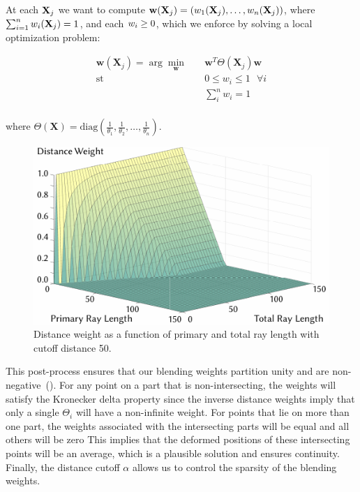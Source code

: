
At each $\mathbf{X}_j$ we want to compute $\mathbf{w}(\mathbf{X}_j) =  \left( w_1(\mathbf{X}_j), \dots, w_n(\mathbf{X}_j) \right)$, where 
$\sum_{i=1}^nw_i(\mathbf{X}_j) = 1$, and each $w_i \geq 0$, which we enforce by solving a local optimization problem: 

\begin{equation}
\begin{aligned}
\mathbf{w}(\mathbf{X}_j) =  \arg\min_{\mathbf{w}} \quad & \mathbf{w}^T \Theta(\mathbf{X}_j) \mathbf{w}    \\
\textrm{st} \quad & 0 \leq w_i \leq 1 \mbox{ }\forall i                    \\
                  &   \sum_i^n w_i = 1                      \\
\end{aligned}
\end{equation}

where $\Theta(\mathbf{X}) = \text{diag}\left( \frac{1}{\theta_1},\frac{1}{\theta_2},\dots,\frac{1}{\theta_n}\right)$. 

\begin{figure}
    \begin{center}
            \includegraphics[width=0.3\columnwidth]{figures/plot_distance_weight.pdf}
            
    \end{center}
    \label{fig:plot_distance_weight}
    \caption{Distance weight as a function of primary and total ray length with cutoff distance 50.}
  \end{figure}


This post-process ensures that our blending weights partition unity and are non-negative~(). 
For any point on a part that is non-intersecting, the weights will satisfy the Kronecker delta property since the inverse distance weights imply that only
a single $\Theta_i$ will have a non-infinite weight. 
For points that lie on more than one part, the weights associated with the intersecting parts will be equal and all others will be zero
This implies that the deformed positions of these intersecting points will be an average, which is a plausible solution and ensures continuity.
Finally, the distance cutoff $\alpha$ allows us to control the sparsity of the blending weights.

